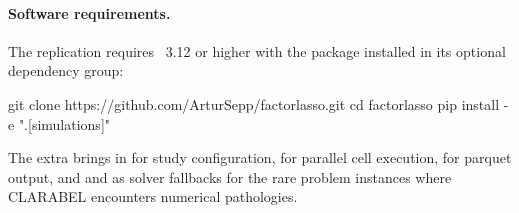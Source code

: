 \documentclass[article]{jss}
\begin{document}
\begin{appendix}
\paragraph{Software requirements.}
The replication requires ~3.12 or higher with the
 package installed in its 
optional dependency group:
%
\begin{CodeChunk}
	\begin{CodeInput}
git clone https://github.com/ArturSepp/factorlasso.git
cd factorlasso
pip install -e ".[simulations]"
	\end{CodeInput}
\end{CodeChunk}
%
The \code{[simulations]} extra brings in  \citep{pyyaml}
for study configuration,  for parallel cell execution,
 \citep{pyarrow} for parquet output, and  and
 as
solver fallbacks for the rare problem instances where CLARABEL
encounters numerical pathologies.


\end{appendix}
\end{document}
